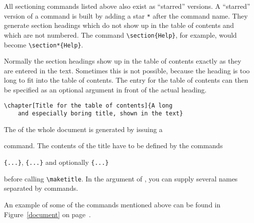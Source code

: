 All sectioning commands listed above also exist as ``starred''
versions.  A ``starred'' version of a command is built by adding a
star \verb|*| after the command name.  They generate section headings
which do not show up in the table of contents and which are not
numbered. The command \verb|\section{Help}|, for example, would become
\verb|\section*{Help}|.

Normally the section headings show up in the table of contents exactly
as they are entered in the text. Sometimes this is not possible,
because the heading is too long to fit into the table of contents. The
entry for the table of contents can then be specified as an
optional argument in front of the actual heading.

\begin{code}
\verb|\chapter[Title for the table of contents]{A long|\\
\verb|    and especially boring title, shown in the text}|
\end{code} 

The  of the whole document is generated by issuing a 
\begin{lscommand}
\end{lscommand}
\noindent command. The contents of the title have to be defined by the commands
\begin{lscommand}
\verb|{...}|, \verb|{...}| 
and optionally \verb|{...}| 
\end{lscommand}
\noindent before calling \verb|\maketitle|. In the argument of , you can
supply several names separated by  commands. 

An example of some of the commands mentioned above can be found in
Figure~\ref{document} on page~\pageref{document}.

